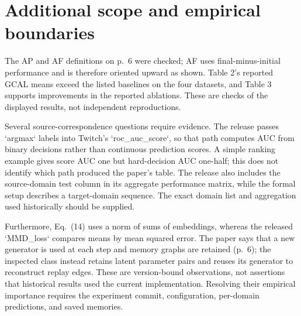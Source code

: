 \documentclass[10pt]{article}
\begin{document}
\section*{Additional scope and empirical boundaries}
The AP and AF definitions on p. 6 were checked; AF uses final-minus-initial performance and is therefore oriented upward as shown. Table 2’s reported GCAL means exceed the listed baselines on the four datasets, and Table 3 supports improvements in the reported ablations. These are checks of the displayed results, not independent reproductions.\par
Several source-correspondence questions require evidence. The release passes `argmax` labels into Twitch’s `roc\_auc\_score`, so that path computes AUC from binary decisions rather than continuous prediction scores. A simple ranking example gives score AUC one but hard-decision AUC one-half; this does not identify which path produced the paper’s table. The release also includes the source-domain test column in its aggregate performance matrix, while the formal setup describes a target-domain sequence. The exact domain list and aggregation used historically should be supplied.\par
Furthermore, Eq. (14) uses a norm of sums of embeddings, whereas the released `MMD\_loss` compares means by mean squared error. The paper says that a new generator is used at each step and memory graphs are retained (p. 6); the inspected class instead retains latent parameter pairs and reuses its generator to reconstruct replay edges. These are version-bound observations, not assertions that historical results used the current implementation. Resolving their empirical importance requires the experiment commit, configuration, per-domain predictions, and saved memories.\par
\end{document}
